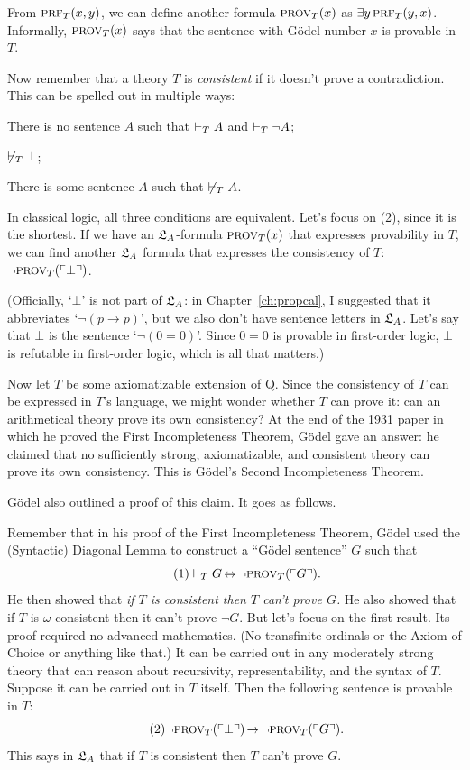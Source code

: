From $\smallcaps{Prf}_T(x,y)$,
we can define another formula $\smallcaps{Prov}_T(x)$ as
$\exists y \, \smallcaps{Prf}_{T}(y,x)$.
Informally,
$\smallcaps{Prov}_T(x)$ says that
the sentence with Gödel number $x$ is provable in $T$.

Now remember that a theory $T$ is \emph{consistent} if it doesn't prove a contradiction.
This can be spelled out in multiple ways:
\begin{cenumerate}
  \item[(1)] There is no sentence $A$ such that $\vdash_T A$ and $\vdash_T \neg A$;
  \item[(2)] $\not\vdash_T \bot$;
  \item[(3)] There is some sentence $A$ such that $\not\vdash_T A$.
\end{cenumerate}
In classical logic,
all three conditions are equivalent.
Let's focus on (2), since it is the shortest.
If we have an $\mathfrak{L}_A$-formula $\smallcaps{Prov}_T(x)$ that expresses provability in $T$,
we can find another $\mathfrak{L}_A$ formula that expresses the consistency of $T$:
$\neg \smallcaps{Prov}_{T}(\gn{\bot})$.

(Officially,
`$\bot$' is not part of $\mathfrak{L}_A$:
in Chapter~\ref{ch:propcal}, I suggested that it abbreviates `$\neg(p \to p)$',
but we also don't have sentence letters in $\mathfrak{L}_A$.
Let's say that $\bot$ is the sentence `$\neg(0\!=\!0)$'.
Since $0\!=\!0$ is provable in first-order logic,
$\bot$ is refutable in first-order logic,
which is all that matters.)

Now let $T$ be some axiomatizable extension of Q.
Since the consistency of $T$ can be expressed in $T$'s language,
we might wonder whether $T$ can prove it:
can an arithmetical theory prove its own consistency?
At the end of the 1931 paper
in which he proved the First Incompleteness Theorem,
Gödel gave an answer:
he claimed that
no sufficiently strong, axiomatizable, and consistent theory
can prove its own consistency.
This is Gödel's Second Incompleteness Theorem.

Gödel also outlined a proof of this claim.
It goes as follows.

Remember that in his proof of the First Incompleteness Theorem,
Gödel used the (Syntactic) Diagonal Lemma to construct a ``Gödel sentence'' $G$ such that
\begin{equation}\tag{1}
  \proves_{T} G \leftrightarrow \neg \smallcaps{Prov}_{T}(\gn{G}).
\end{equation}
He then showed that
\emph{if $T$ is consistent then $T$ can't prove $G$.}
He also showed that
if $T$ is $\omega$-consistent then it can't prove $\neg G$.
But let's focus on the first result.
Its proof required no advanced mathematics.
(No transfinite ordinals or the Axiom of Choice or anything like that.)
It can be carried out in any moderately strong theory
that can reason about recursivity, representability, and the syntax of $T$.
Suppose it can be carried out in $T$ itself.
Then the following sentence is provable in $T$:
\begin{equation}\tag{2}
  \neg \smallcaps{prov}_T(\gn{\bot}) \to \neg \smallcaps{Prov}_T(\gn{G}).
\end{equation}
This says in $\mathfrak{L}_A$ that
if $T$ is consistent
then $T$ can't prove $G$.


